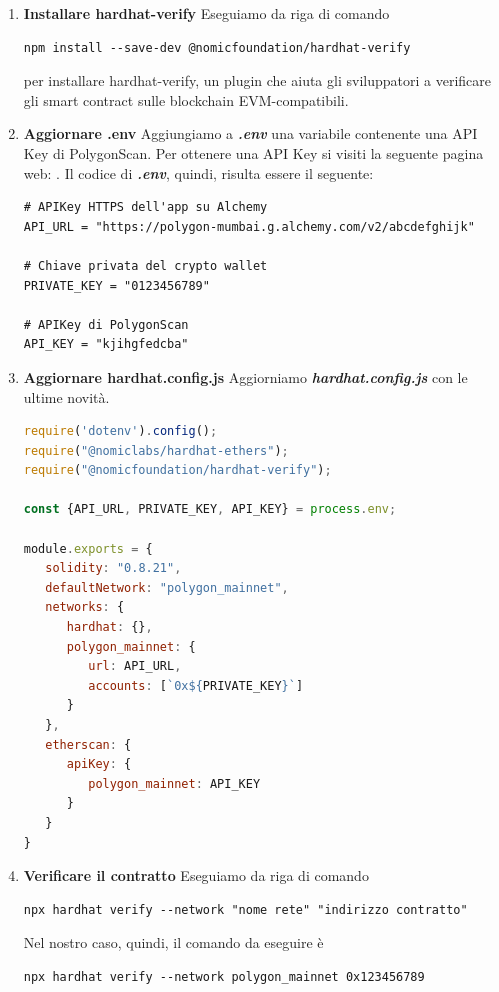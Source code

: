\documentclass[12pt]{report}
\begin{document}
\begin{enumerate}[topsep=5pt, itemsep=0pt]

\item \textbf{Installare hardhat-verify}\newline
Eseguiamo da riga di comando
\begin{lstlisting}[language=HTML, numbers=none, aboveskip=2pt, belowskip=-3pt]
npm install --save-dev @nomicfoundation/hardhat-verify
\end{lstlisting}
per installare hardhat-verify, un plugin che aiuta gli sviluppatori a verificare gli smart contract sulle blockchain EVM-compatibili.

\item \textbf{Aggiornare .env}\newline
Aggiungiamo a \textit{\textbf{.env}} una variabile contenente una API Key di PolygonScan.\newline
Per ottenere una API Key si visiti la seguente pagina web: \cite{Venti}.\newline
Il codice di \textit{\textbf{.env}}, quindi, risulta essere il seguente:
\begin{lstlisting}[language=HTML, numbers=none, aboveskip=2pt]
# APIKey HTTPS dell'app su Alchemy
API_URL = "https://polygon-mumbai.g.alchemy.com/v2/abcdefghijk"

# Chiave privata del crypto wallet
PRIVATE_KEY = "0123456789"

# APIKey di PolygonScan
API_KEY = "kjihgfedcba"
\end{lstlisting}\newpage

\item \textbf{Aggiornare hardhat.config.js}\newline
Aggiorniamo \textit{\textbf{hardhat.config.js}} con le ultime novità.
\begin{lstlisting}[language=JavaScript, aboveskip=2pt]
require('dotenv').config();
require("@nomiclabs/hardhat-ethers");
require("@nomicfoundation/hardhat-verify");

const {API_URL, PRIVATE_KEY, API_KEY} = process.env;

module.exports = {
   solidity: "0.8.21",
   defaultNetwork: "polygon_mainnet",
   networks: {
      hardhat: {},
      polygon_mainnet: {
         url: API_URL,
         accounts: [`0x${PRIVATE_KEY}`]
      }
   },
   etherscan: {
      apiKey: {
         polygon_mainnet: API_KEY
      }
   }
}
\end{lstlisting}

\item \textbf{Verificare il contratto}\newline
Eseguiamo da riga di comando
\begin{lstlisting}[language=HTML, numbers=none, aboveskip=2pt, belowskip=-3pt]
npx hardhat verify --network "nome rete" "indirizzo contratto"
\end{lstlisting}
Nel nostro caso, quindi, il comando da eseguire è
\begin{lstlisting}[language=HTML, numbers=none, aboveskip=2pt]
npx hardhat verify --network polygon_mainnet 0x123456789
\end{lstlisting}
\end{enumerate}\newpage
\end{document}
